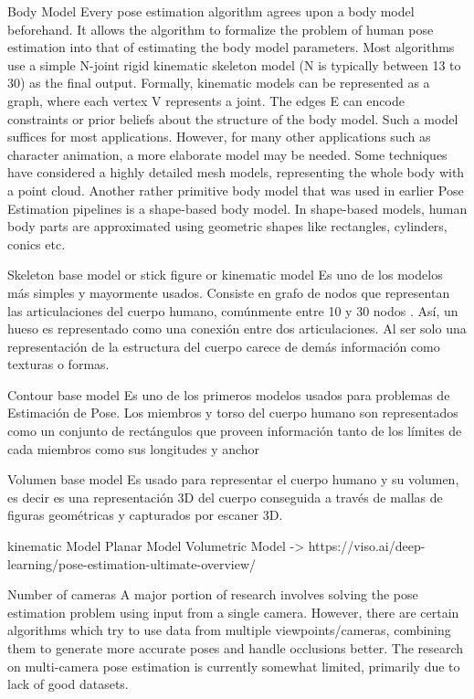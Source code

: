 Body Model
Every pose estimation algorithm agrees upon a body model beforehand. It allows the algorithm to formalize the problem of human pose estimation into that of estimating the body model parameters. Most algorithms use a simple N-joint rigid kinematic skeleton model (N is typically between 13 to 30) as the final output. Formally, kinematic models can be represented as a graph, where each vertex V represents a joint. The edges E can encode constraints or prior beliefs about the structure of the body model.
Such a model suffices for most applications. However, for many other applications such as character animation, a more elaborate model may be needed. Some techniques have considered a highly detailed mesh models, representing the whole body with a point cloud.
Another rather primitive body model that was used in earlier Pose Estimation pipelines is a shape-based body model. In shape-based models, human body parts are approximated using geometric shapes like rectangles, cylinders, conics etc.

Skeleton base model or stick figure or kinematic model
Es uno de los modelos más simples y mayormente usados. Consiste en grafo de nodos que representan
las articulaciones del cuerpo humano, comúnmente entre 10 y 30 nodos \cite{Felzenszwalb2005}.
Así, un hueso es representado
como una conexión entre dos articulaciones. Al ser solo una representación de la estructura del cuerpo
carece de demás información como texturas o formas.

Contour base model
Es uno de los primeros modelos usados para problemas de Estimación de Pose. Los miembros y torso del
cuerpo humano son representados como un conjunto de rectángulos que proveen información tanto de los
límites de cada miembros como sus longitudes y anchor \cite{557241} \cite{COOTES199538}

Volumen base model
Es usado para representar el cuerpo humano y su volumen, es decir es una representación 3D del
cuerpo conseguida a través de mallas de figuras geométricas y capturados por escaner 3D.

kinematic Model
Planar Model
Volumetric Model
-> https://viso.ai/deep-learning/pose-estimation-ultimate-overview/

Number of cameras
A major portion of research involves solving the pose estimation problem using input from a single camera. However, there are certain algorithms which try to use data from multiple viewpoints/cameras, combining them to generate more accurate poses and handle occlusions better. The research on multi-camera pose estimation is currently somewhat limited, primarily due to lack of good datasets.

